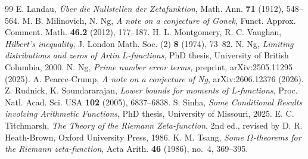 \documentclass[12pt,a4paper,reqno]{amsart}
\theoremstyle{remark}
\numberwithin{equation}{section}
\begin{document}
\begin{thebibliography}{99}
 E. Landau, \emph{\"Uber die Nullstellen der Zetafunktion}, Math. Ann. \textbf{71} (1912), 548--564.
 M. B. Milinovich, N. Ng, \emph{A note on a conjecture of Gonek}, Funct. Approx. Comment. Math. \textbf{46.2} (2012), 177--187.
 H. L. Montgomery, R. C. Vaughan, \emph{Hilbert's inequality}, J. London Math. Soc. (2) \textbf{8} (1974), 73--82.
 N. Ng, \emph{Limiting distributions and zeros of Artin $L$-functions}, PhD thesis, University of British Columbia, 2000.
 N. Ng, \emph{Prime number error terms}, preprint, arXiv:2505.11295 (2025).
 A. Pearce-Crump, \emph{A note on a conjecture of Ng}, arXiv:2606.12376 (2026).
 Z. Rudnick, K. Soundararajan, \emph{Lower bounds for moments of $L$-functions}, Proc. Natl. Acad. Sci. USA \textbf{102} (2005), 6837--6838.
 S. Sinha, \emph{Some Conditional Results involving Arithmetic Functions}, PhD thesis, University of Missouri, 2025.
 E. C. Titchmarsh, \emph{The Theory of the Riemann Zeta-function}, 2nd ed., revised by D. R. Heath-Brown, Oxford University Press, 1986.
 K. M. Tsang, \emph{Some $\Omega$-theorems for the Riemann zeta-function}, Acta Arith. \textbf{46} (1986), no.~4, 369--395.
\end{thebibliography}
\end{document}
